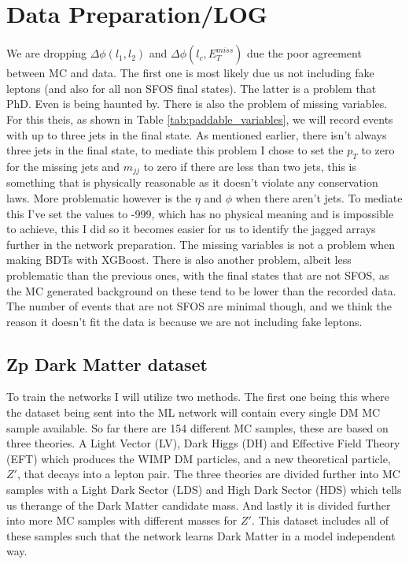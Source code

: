 \documentclass[14pt, a4paper]{book}
\begin{document}
\label{chap:Method_ML}

\graphicspath{{../../figures/}}
\section{Data Preparation/LOG}
We are dropping $\Delta\phi(l_1,l_2)$ and $\Delta\phi(l_c,E_T^{miss})$ due the poor agreement between MC and data. The first one is most likely due us not including fake leptons (and also for all non SFOS final states). The latter is a problem that PhD. Even is being haunted by. 
There is also the problem of missing variables. For this theis, as shown in Table \ref{tab:paddable_variables}, we will record events with up to three jets in the final state. As mentioned earlier, there isn't 
always three jets in the final state, to mediate this problem I chose to set the $p_T$ to zero for the missing jets and $m_{jj}$ to zero if there are less than two jets, this is something that is physically reasonable as it doesn't violate any conservation laws. 
More problematic however is the $\eta$ and $\phi$ when there aren't jets. To mediate this I've set the values to -999, which has no physical meaning and is impossible to achieve, this I did so it becomes easier for us to identify the jagged arrays further in the network preparation. 
The missing variables is not a problem when making BDTs with XGBoost. There is also another problem, albeit less problematic than the previous ones, with the final states that are not SFOS, as the MC generated background 
on these tend to be lower than the recorded data. The number of events that are not SFOS are minimal though, and we think the reason it doesn't fit the data is because we are not including fake leptons. 

\subsection{Zp Dark Matter dataset}
To train the networks I will utilize two methods. The first one being this where the dataset being sent into the ML network will contain every single DM MC sample available. 
So far there are 154 different MC samples, these are based on three theories. A Light Vector (LV), Dark Higgs (DH) and Effective Field Theory (EFT) which produces the WIMP DM particles, and a new theoretical particle, $Z'$, 
that decays into a lepton pair. The three theories are divided further into MC samples with a Light Dark Sector (LDS) and High Dark Sector (HDS) which tells us therange of the Dark Matter candidate mass. 
And lastly it is divided further into more MC samples with different masses for $Z'$. This dataset includes all of these samples such that the network learns Dark Matter in a model independent way.
\end{document}
